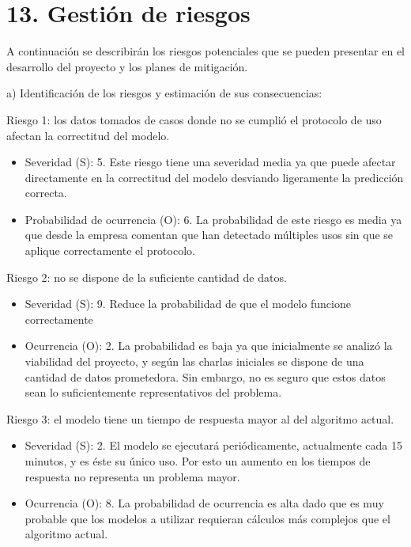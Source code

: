 \documentclass[
11pt, %
]{charter}
\begin{document}
\section{13. Gestión de riesgos}
\label{sec:riesgos}

A continuación se describirán los riesgos potenciales que se pueden presentar en el desarrollo del proyecto y los planes de mitigación.

a) Identificación de los riesgos y estimación de sus consecuencias:
 
Riesgo 1: los datos tomados de casos donde no se cumplió el protocolo de uso afectan la correctitud del modelo.
\begin{itemize}
	\item Severidad (S): 5. 
	Este riesgo tiene una severidad media ya que puede afectar directamente en la correctitud del modelo desviando ligeramente la predicción correcta.
	\item Probabilidad de ocurrencia (O): 6. 
	La probabilidad de este riesgo es media ya que desde la empresa comentan que han detectado múltiples usos sin que se aplique correctamente el protocolo.
\end{itemize}

Riesgo 2: no se dispone de la suficiente cantidad de datos.
\begin{itemize}
	\item Severidad (S): 9. 
	Reduce la probabilidad de que el modelo funcione correctamente
	\item Ocurrencia (O): 2.
	La probabilidad es baja ya que inicialmente se analizó la viabilidad del proyecto, y según las charlas iniciales se dispone de una cantidad de datos prometedora. Sin embargo, no es seguro que estos datos sean lo suficientemente representativos del problema.
\end{itemize}

Riesgo 3: el modelo tiene un tiempo de respuesta mayor al del algoritmo actual.
\begin{itemize}
	\item Severidad (S): 2.
	El modelo se ejecutará periódicamente, actualmente cada 15 minutos, y es éste su único uso. Por esto un aumento en los tiempos de respuesta no representa un problema mayor.
	\item Ocurrencia (O): 8. 
	La probabilidad de ocurrencia es alta dado que es muy probable que los modelos a utilizar requieran cálculos más complejos que el algoritmo actual.
\end{itemize}
\end{document}
